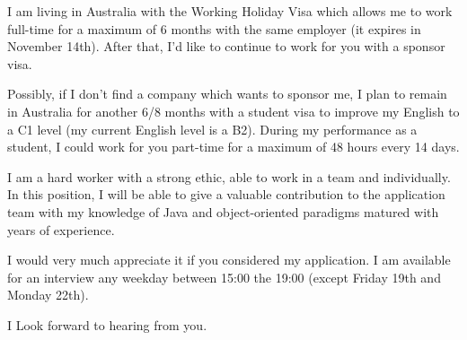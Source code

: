 \documentclass[11pt, a4paper]{awesome-cv}
\begin{document}
\begin{cvletter}
I am living in Australia with the Working Holiday Visa which allows me to work full-time for a maximum of 6 months with the same employer (it expires in November 14th). After that, I’d like to continue to work for you with a sponsor visa.

Possibly, if I don't find a company which wants to sponsor me, I plan to remain in Australia for another 6/8 months with a student visa to improve my English to a C1 level (my current English level is a B2). During my performance as a student, I could work for you part-time for a maximum of 48 hours every 14 days.


I am a hard worker with a strong ethic, able to work in a team and individually. In this position, I will be able to give a valuable contribution to the application team with my knowledge of Java and object-oriented paradigms matured with years of experience.

I would very much appreciate it if you considered my application. I am available for an interview any weekday between 15:00 the 19:00 (except Friday 19th and Monday 22th).

I Look forward to hearing from you.

\end{cvletter}


\makeletterclosing
\end{document}
